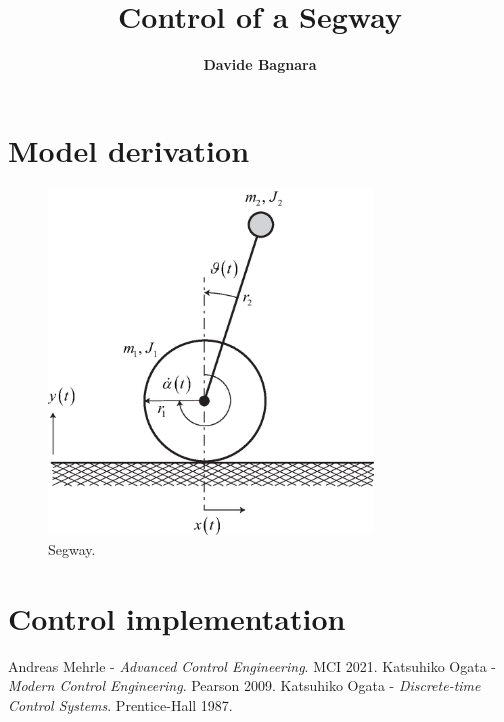 \documentclass[11pt,a4paper]{article}
\title{\textbf{Control of a Segway}}
\author{\textbf{Davide Bagnara}}
\numberwithin{equation}{section}
\theoremstyle{it}
\theoremstyle{definition}
\theoremstyle{it}
\begin{document}
	\thispagestyle{firstpage}
	\begin{mybox}
		\maketitle
		\vspace{125mm}
	\end{mybox}
	\newpage
	\tableofcontents
	\listoffigures	
	\listoftables
	\newpage
	
\section{Model derivation}
\begin{figure}[H]
	\centering
	\includegraphics[height = 260pt, keepaspectratio]{figures/segway.eps}
	\captionsetup{width=0.75\textwidth}		
	\caption{Segway.}
	\label{fig1}
\end{figure}
\section{Control implementation}


\clearpage
\begin{thebibliography}{99}
	 Andreas Mehrle - \textit{Advanced Control Engineering}. MCI 2021.
	 Katsuhiko Ogata - \textit{Modern Control Engineering}. Pearson 2009.	
	 Katsuhiko Ogata - \textit{Discrete-time Control Systems}. Prentice-Hall 1987.
\end{thebibliography}


\end{document}
